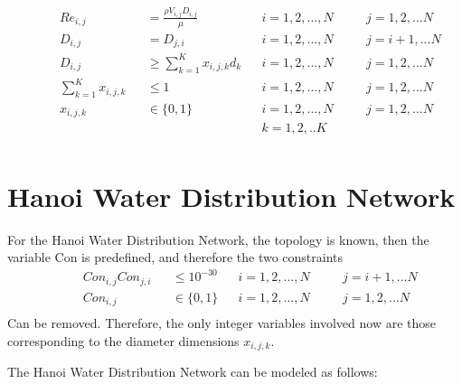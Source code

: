 \documentclass[12pt]{article}
\begin{document}
\begin{equation}
\begin{aligned}
    & && Re_{i,j} && = \frac{\rho V_{i,j} D_{i,j}}{\mu} && i = 1, 2, ..., N \quad && j = 1, 2, ... N\\
    & && D_{i,j} && = D_{j,i} && i = 1, 2, ..., N \quad && j = i+1, ... N\\
    & && D_{i,j} && \geq \sum_{k=1}^{K}x_{i,j,k}d_k && i = 1, 2, ..., N \quad && j = 1, 2, ... N\\
    & && \sum_{k=1}^{K} x_{i,j,k} && \leq 1 && i = 1, 2, ..., N \quad && j = 1, 2, ... N\\
    & && x_{i,j,k} && \in \{0,1\} && i = 1, 2, ..., N \quad && j = 1, 2, ... N \\
    & && && && k = 1,2, ..K\\ 
\end{aligned}
\end{equation}

\section{Hanoi Water Distribution Network}

For the Hanoi Water Distribution Network, the topology is known, then the variable Con is predefined, and therefore the two constraints
\begin{equation}
\begin{aligned}
    & && Con_{i,j}Con_{j,i} && \leq 10^{-30} && i = 1, 2, ..., N \quad && j = i+1, ... N\\
    & && Con_{i,j} &&\in \{0,1\} && i = 1, 2, ..., N \quad && j = 1, 2, ... N\\
\end{aligned}
\end{equation}
 Can be removed. Therefore, the only integer variables involved now are those corresponding to the diameter dimensions $x_{i,j,k}$.
 
 The Hanoi Water Distribution Network can be modeled as follows:
 
\end{document}
